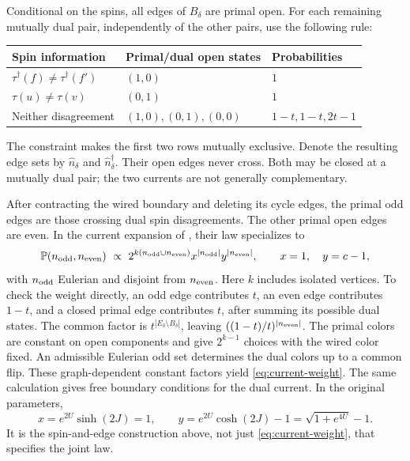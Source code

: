 Conditional on the spins, all edges of \(B_\delta\) are primal open.
For each remaining mutually dual pair, independently of the other pairs,
use the following rule:
\begin{center}
\begin{tabular}{@{}lll@{}}
\toprule
Spin information & Primal/dual open states & Probabilities\\
\midrule
\(\tau^\dagger(f)\ne\tau^\dagger(f')\) & \((1,0)\) & \(1\)\\
\(\tau(u)\ne\tau(v)\) & \((0,1)\) & \(1\)\\
Neither disagreement & \((1,0),(0,1),(0,0)\) & \(1-t,1-t,2t-1\)\\
\bottomrule
\end{tabular}
\end{center}
The constraint makes the first two rows mutually exclusive.
Denote the resulting edge sets by
\(\widehat n_\delta\) and \(\widehat n_\delta^\dagger\).
Their open edges never cross. Both may be closed at a mutually dual pair;
the two currents are not generally complementary.

After contracting the wired boundary and deleting its cycle edges, the
primal odd edges are those crossing dual spin disagreements. The other
primal open edges are even. In the current expansion of
\cite[Section~2, Equations~(2)--(3) and Proposition~1]{Lis2022Boundary},
their law specializes to
\begin{equation}\label{eq:current-weight}
 \P(n_{\rm odd},n_{\rm even})\ \propto\
 2^{k(n_{\rm odd}\cup n_{\rm even})}
 x^{|n_{\rm odd}|}y^{|n_{\rm even}|},
 \qquad
 x=1,\quad y=c-1,
\end{equation}
with \(n_{\rm odd}\) Eulerian and disjoint from \(n_{\rm even}\).
Here \(k\) includes isolated vertices. To check the weight directly,
an odd edge contributes \(t\), an even edge contributes \(1-t\),
and a closed primal edge contributes \(t\), after summing its possible
dual states. The common factor is \(t^{|E_\delta\setminus B_\delta|}\),
leaving \(((1-t)/t)^{|n_{\rm even}|}\).
The primal colors are constant on open components and give
\(2^{k-1}\) choices with the wired color fixed. An admissible Eulerian
odd set determines the dual colors up to a common flip.
These graph-dependent constant factors yield \cref{eq:current-weight}.
The same calculation gives free boundary conditions for the dual current.
In the original parameters,
\[
 x=e^{2U}\sinh(2J)=1,\qquad
 y=e^{2U}\cosh(2J)-1=\sqrt{1+e^{4U}}-1.
\]
It is the spin-and-edge construction above, not just
\cref{eq:current-weight}, that specifies the joint law.

